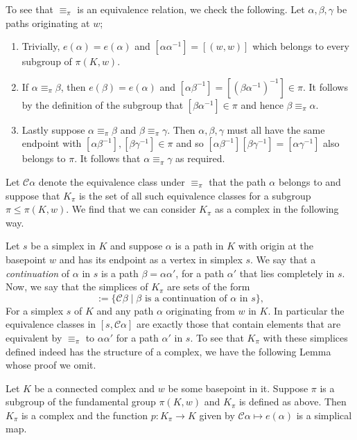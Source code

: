 To see that $\equiv_{\pi}$ is an equivalence relation, we check the following. Let $\alpha,\beta,\gamma$ be paths originating at $w$;
\begin{enumerate}
\item Trivially, $e(\alpha) = e(\alpha)$ and $[\alpha \alpha^{-1}] = [(w,w)]$ which belongs to every subgroup of $\pi(K,w)$.
\item If $\alpha \equiv_{\pi} \beta$, then $e(\beta) = e(\alpha)$ and $[\alpha \beta^{-1}] = [(\beta \alpha^{-1})^{-1}] \in \pi$. It follows by the definition of the subgroup that $[\beta \alpha^{-1}] \in \pi$ and hence $\beta \equiv_{\pi} \alpha$.
\item Lastly suppose $\alpha \equiv_{\pi} \beta$ and $\beta \equiv_{\pi} \gamma$. Then $\alpha,\beta,\gamma$ must all have the same endpoint with $[\alpha\beta^{-1}],[\beta\gamma^{-1}] \in \pi$ and so $[\alpha\beta^{-1}][\beta\gamma^{-1}] = [\alpha\gamma^{-1}]$ also belongs to $\pi$. It follows that $\alpha \equiv_{\pi} \gamma$ as required.
\end{enumerate}

Let \emph{$\mathcal{C}\alpha$} denote the equivalence class under $\equiv_{\pi}$ that the path $\alpha$ belongs to and suppose that $K_{\pi}$ is the set of all such equivalence classes for a subgroup $\pi \leq \pi(K,w)$. We find that we can consider $K_{\pi}$ as a complex in the following way.

Let $s$ be a simplex in $K$ and suppose $\alpha$ is a path in $K$ with origin at the basepoint $w$ and has its endpoint as a vertex in simplex $s$. We say that a \emph{continuation} of $\alpha$ in $s$ is a path $\beta = \alpha\alpha'$, for a path $\alpha'$ that lies completely in $s$. Now, we say that the simplices of $K_{\pi}$ are sets of the form
\begin{equation*}
  [s,\mathcal{C}\alpha] := \{\mathcal{C}\beta \mid \beta \text{ is a continuation of } \alpha \text{ in } s \},
\end{equation*}
For a simplex $s$ of $K$ and any path $\alpha$ originating from $w$ in $K$. In particular the equivalence classes in $[s,\mathcal{C}\alpha]$ are exactly those that contain elements that are equivalent by $\equiv_{\pi}$ to $\alpha\alpha'$ for a path $\alpha'$ in $s$. To see that $K_{\pi}$ with these simplices defined indeed has the structure of a complex, we have the following Lemma whose proof we omit.

\begin{lemma}
  \label{lem:pip}
  Let $K$ be a connected complex and $w$ be some basepoint in it. Suppose $\pi$ is a subgroup of the fundamental group $\pi(K,w)$ and $K_{\pi}$ is defined as above. Then $K_{\pi}$ is a complex and the function $p:K_{\pi} \rightarrow K$ given by $\mathcal{C}\alpha \mapsto e(\alpha)$ is a simplical map.
\end{lemma}

